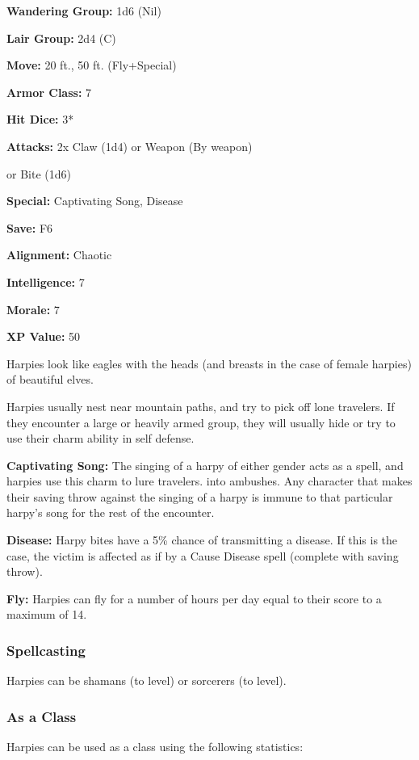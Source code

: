 \begin{multicols*}{2}
{\textbf{Wandering Group:} 1d6 (Nil)

\textbf{Lair Group:} 2d4 (C)

\textbf{Move:} 20 ft., 50 ft. (Fly+Special)

\textbf{Armor Class:} 7

\textbf{Hit Dice:} 3*

\textbf{Attacks:} 2x Claw (1d4) or Weapon (By weapon) 

or Bite (1d6)

\textbf{Special:} Captivating Song, Disease

\textbf{Save:} F6

\textbf{Alignment:} Chaotic

\textbf{Intelligence:} 7

\textbf{Morale:} 7

\textbf{XP Value:} 50}

Harpies look like eagles with the heads (and breasts in the case of female harpies) of beautiful elves.

Harpies usually nest near mountain paths, and try to pick off lone travelers. If they encounter a large or heavily armed group, they will usually hide or try to use their charm ability in self defense.

\textbf{Captivating Song:} The singing of a harpy of either gender acts as a  spell, and harpies use this charm to lure travelers. into ambushes. Any character that makes their saving throw against the singing of a harpy is immune to that particular harpy’s song for the rest of the encounter.

\textbf{Disease:} Harpy bites have a 5\% chance of transmitting a disease. If this is the case, the victim is affected as if by a Cause Disease spell (complete with saving throw).

\textbf{Fly:} Harpies can fly for a number of hours per day equal to their  score to a maximum of 14.

\subsubsection{Spellcasting}
Harpies can be shamans (to  level) or sorcerers (to  level).

\subsubsection{As a Class}
Harpies can be used as a class using the following statistics:


\end{multicols*}

